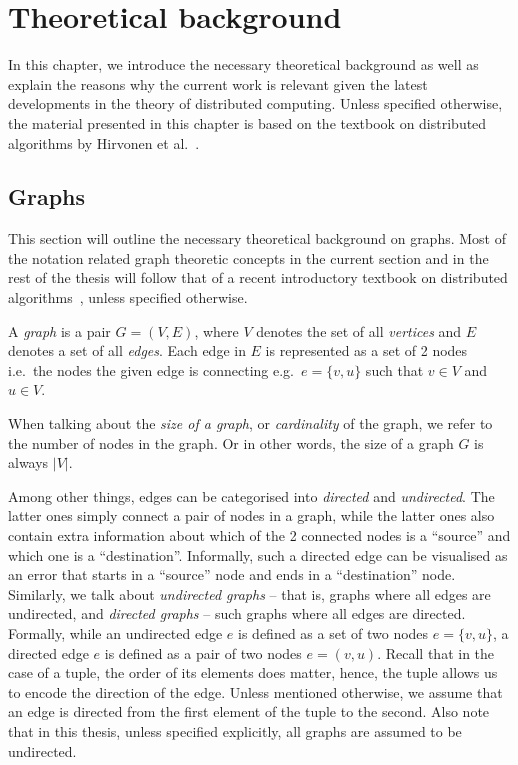 \chapter{Theoretical background}
\label{chapter:background}

In this chapter, we introduce the necessary theoretical background as well as
explain the reasons why the current work is relevant given the latest
developments in the theory of distributed computing. Unless specified otherwise,
the material presented in this chapter is based on the textbook on distributed algorithms by Hirvonen et al.~\cite{Hirvonen2020}.

\section{Graphs}

This section will outline the necessary theoretical background on graphs. 
Most of the notation related graph theoretic concepts in the current
section and in the rest of the thesis will follow that of
a recent introductory textbook on distributed algorithms~\cite{Hirvonen2020},
unless specified otherwise.

A \emph{graph} is a pair $G = (V, E)$, where $V$ denotes the set of all \emph{vertices}
and $E$ denotes a set of all \emph{edges}. Each edge in $E$ is represented as a set of
2 nodes i.e.\ the nodes the given edge is connecting e.g.\ $e = \{v, u\}$ such that 
$v \in V$ and $u \in V$.

When talking about the \emph{size of a graph}, or \emph{cardinality} of the graph, we refer
to the number of nodes in the graph. Or in other words, the size of a graph $G$
is always $|V|$.

Among other things, edges can be categorised into \emph{directed} and \emph{undirected}.
The latter ones simply connect a pair of nodes in a graph, while the latter
ones also contain extra information about which of the 2 connected nodes is
a ``source'' and which one is a ``destination''. Informally, such a directed edge
can be visualised as an error that starts in a ``source'' node and ends in a 
``destination'' node.  Similarly, we talk about \emph{undirected graphs} -- that is, graphs
where all edges are undirected, and \emph{directed graphs} -- such graphs where all
edges are directed. Formally, while an undirected edge $e$ is defined as a
set of two nodes $e = \{v, u\}$, a directed edge $e$ is defined as a pair
of two nodes $e = (v, u)$. Recall that in the case of a tuple, the order of its
elements does matter, hence, the tuple allows us to encode the direction of
the edge. Unless mentioned otherwise, we assume that an edge is directed
from the first element of the tuple to the second. Also note that in this
thesis, unless specified explicitly, all graphs are assumed to be undirected.


